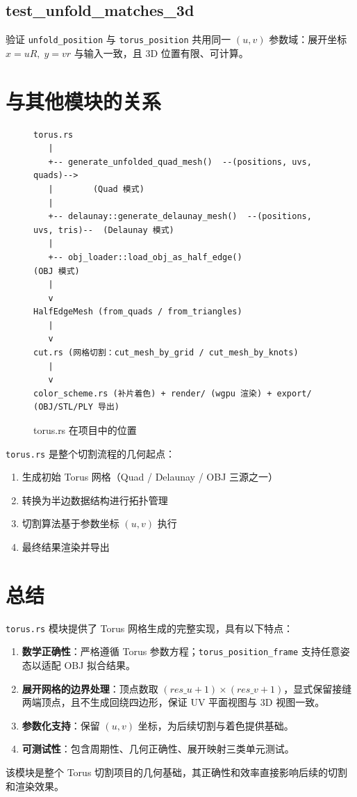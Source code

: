 \documentclass[12pt,a4paper]{article}
\begin{document}
\subsection{test\_unfold\_matches\_3d}

验证 \texttt{unfold\_position} 与 \texttt{torus\_position} 共用同一 $(u,v)$ 参数域：展开坐标 $x=uR,\; y=vr$ 与输入一致，且 3D 位置有限、可计算。

\section{与其他模块的关系}

\begin{figure}[h]
\centering
\begin{verbatim}
torus.rs
   |
   +-- generate_unfolded_quad_mesh()  --(positions, uvs, quads)-->
   |        (Quad 模式)
   |
   +-- delaunay::generate_delaunay_mesh()  --(positions, uvs, tris)--  (Delaunay 模式)
   |
   +-- obj_loader::load_obj_as_half_edge()                (OBJ 模式)
   |
   v
HalfEdgeMesh (from_quads / from_triangles)
   |
   v
cut.rs (网格切割：cut_mesh_by_grid / cut_mesh_by_knots)
   |
   v
color_scheme.rs (补片着色) + render/ (wgpu 渲染) + export/ (OBJ/STL/PLY 导出)
\end{verbatim}
\caption{torus.rs 在项目中的位置}
\end{figure}

\texttt{torus.rs} 是整个切割流程的几何起点：
\begin{enumerate}
\item 生成初始 Torus 网格（Quad / Delaunay / OBJ 三源之一）
\item 转换为半边数据结构进行拓扑管理
\item 切割算法基于参数坐标 $(u,v)$ 执行
\item 最终结果渲染并导出
\end{enumerate}

\section{总结}

\texttt{torus.rs} 模块提供了 Torus 网格生成的完整实现，具有以下特点：

\begin{enumerate}
\item \textbf{数学正确性}：严格遵循 Torus 参数方程；\texttt{torus\_position\_frame} 支持任意姿态以适配 OBJ 拟合结果。
\item \textbf{展开网格的边界处理}：顶点数取 $(res\_u+1)\times(res\_v+1)$，显式保留接缝两端顶点，且不生成回绕四边形，保证 UV 平面视图与 3D 视图一致。
\item \textbf{参数化支持}：保留 $(u,v)$ 坐标，为后续切割与着色提供基础。
\item \textbf{可测试性}：包含周期性、几何正确性、展开映射三类单元测试。
\end{enumerate}

该模块是整个 Torus 切割项目的几何基础，其正确性和效率直接影响后续的切割和渲染效果。
\end{document}
